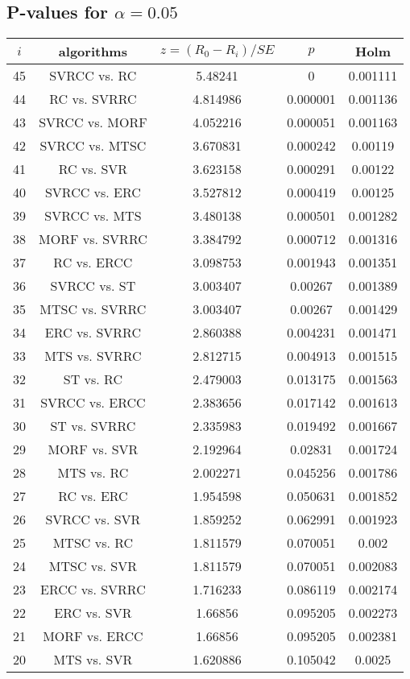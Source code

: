 \documentclass[a4paper,10pt]{article}
\begin{document}
\begin{landscape}
\subsection{P-values for $\alpha=0.05$}

\begin{table}[!htp]
\centering\scriptsize
\begin{tabular}{ccccc}
$i$&algorithms&$z=(R_0 - R_i)/SE$&$p$&Holm\\
\hline45&SVRCC vs. RC&5.48241&0&0.001111\\
44&RC vs. SVRRC&4.814986&0.000001&0.001136\\
43&SVRCC vs. MORF&4.052216&0.000051&0.001163\\
42&SVRCC vs. MTSC&3.670831&0.000242&0.00119\\
41&RC vs. SVR&3.623158&0.000291&0.00122\\
40&SVRCC vs. ERC&3.527812&0.000419&0.00125\\
39&SVRCC vs. MTS&3.480138&0.000501&0.001282\\
38&MORF vs. SVRRC&3.384792&0.000712&0.001316\\
37&RC vs. ERCC&3.098753&0.001943&0.001351\\
36&SVRCC vs. ST&3.003407&0.00267&0.001389\\
35&MTSC vs. SVRRC&3.003407&0.00267&0.001429\\
34&ERC vs. SVRRC&2.860388&0.004231&0.001471\\
33&MTS vs. SVRRC&2.812715&0.004913&0.001515\\
32&ST vs. RC&2.479003&0.013175&0.001563\\
31&SVRCC vs. ERCC&2.383656&0.017142&0.001613\\
30&ST vs. SVRRC&2.335983&0.019492&0.001667\\
29&MORF vs. SVR&2.192964&0.02831&0.001724\\
28&MTS vs. RC&2.002271&0.045256&0.001786\\
27&RC vs. ERC&1.954598&0.050631&0.001852\\
26&SVRCC vs. SVR&1.859252&0.062991&0.001923\\
25&MTSC vs. RC&1.811579&0.070051&0.002\\
24&MTSC vs. SVR&1.811579&0.070051&0.002083\\
23&ERCC vs. SVRRC&1.716233&0.086119&0.002174\\
22&ERC vs. SVR&1.66856&0.095205&0.002273\\
21&MORF vs. ERCC&1.66856&0.095205&0.002381\\
20&MTS vs. SVR&1.620886&0.105042&0.0025\\

\end{tabular}
\end{table}
\end{landscape}
\end{document}

